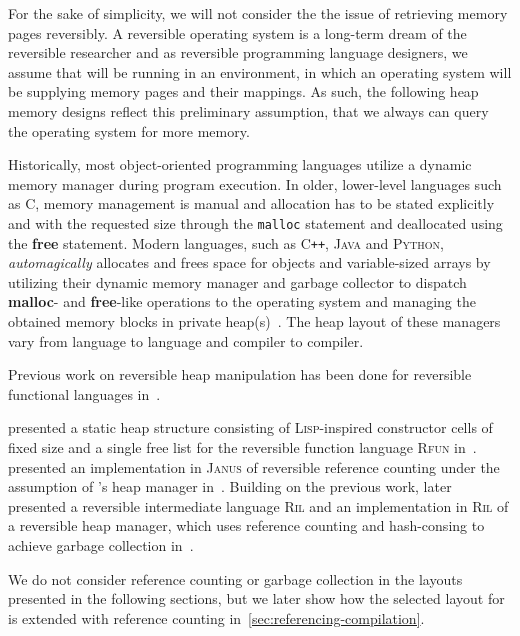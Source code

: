 For the sake of simplicity, we will not consider the the issue of retrieving memory pages reversibly. A reversible operating system is a long-term dream of the reversible researcher and as reversible programming language designers, we assume that \rooplpp will be running in an environment, in which an operating system will be supplying memory pages and their mappings. As such, the following heap memory designs reflect this preliminary assumption, that we always can query the operating system for more memory. 

Historically, most object-oriented programming languages utilize a dynamic memory manager during program execution. In older, lower-level languages such as \textsc{C}, memory management is manual and allocation has to be stated explicitly and with the requested size through the \texttt{malloc} statement and deallocated using the \textbf{free} statement. Modern languages, such as \textsc{C\texttt{++}}, \textsc{Java} and \textsc{Python}, \textit{automagically} allocates and frees space for objects and variable-sized arrays by utilizing their dynamic memory manager and garbage collector to dispatch \textbf{malloc}- and \textbf{free}-like operations to the operating system and managing the obtained memory blocks in private heap(s)~\cite{wh:cpp_memory, bv:jvm, py:memory}. The heap layout of these managers vary from language to language and compiler to compiler.

Previous work on reversible heap manipulation has been done for reversible functional languages in~\cite{ha:heap, jsk:translation, tm:garbage}.

\citeauthor{ha:heap} presented a static heap structure consisting of \textsc{Lisp}-inspired constructor cells of fixed size and a single free list for the reversible function language \textsc{Rfun} in~\cite{ha:heap}. \citeauthor{tm:refcounting} presented an implementation in \textsc{Janus} of reversible reference counting under the assumption of \citeauthor{ha:heap}'s heap manager in~\cite{tm:refcounting}. Building on the previous work, \citeauthor{tm:garbage} later presented a reversible intermediate language \textsc{Ril} and an implementation in \textsc{Ril} of a reversible heap manager, which uses reference counting and hash-consing to achieve garbage collection in~\cite{tm:garbage}.

We do not consider reference counting or garbage collection in the layouts presented in the following sections, but we later show how the selected layout for \rooplpp is extended with reference counting in~\ref{sec:referencing-compilation}.

